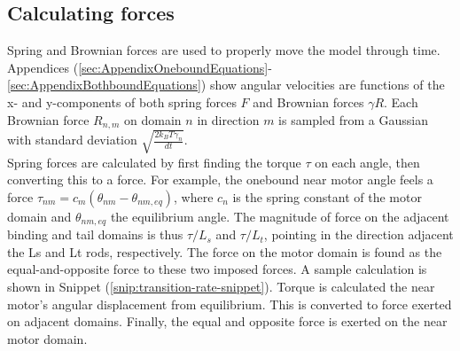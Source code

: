 \documentclass[
11pt, %
english, %
singlespacing, %
headsepline, %
chapterinoneline, %
]{MastersDoctoralThesis} %
\begin{document}



\subsection{Calculating forces}
Spring and Brownian forces are used to properly move the model through time. Appendices (\ref{sec:AppendixOneboundEquations}-\ref{sec:AppendixBothboundEquations}) show angular velocities are functions of the x- and y-components of both spring forces $F$ and Brownian forces $\gamma R$. Each Brownian force $R_{n,m}$ on domain $n$ in direction $m$ is sampled from a Gaussian with standard deviation $\sqrt{\frac{2k_BT\gamma_n}{dt}}$.\\

Spring forces are calculated by first finding the torque $\tau$ on each angle, then converting this to a force. For example, the onebound near motor angle feels a force $\tau_{nm} = c_m(\theta_{nm}-\theta_{nm,eq})$, where $c_n$ is the spring constant of the motor domain and $\theta_{nm,eq}$ the equilibrium angle. The magnitude of force on the adjacent binding and tail domains is thus $\tau/L_s$ and $\tau/L_t$, pointing in the direction adjacent the Ls and Lt rods, respectively. The force on the motor domain is found as the equal-and-opposite force to these two imposed forces. A sample calculation is shown in Snippet (\ref{snip:transition-rate-snippet}). Torque is calculated the near motor's angular displacement from equilibrium. This is converted to force exerted on adjacent domains. Finally, the equal and opposite force is exerted on the near motor domain.\\
\end{document}
